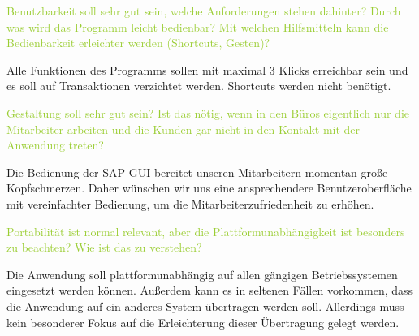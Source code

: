 \textcolor{YellowGreen}{Benutzbarkeit soll sehr gut sein, welche Anforderungen stehen dahinter? Durch was wird das Programm leicht bedienbar? Mit welchen Hilfsmitteln kann die Bedienbarkeit erleichter werden (Shortcuts, Gesten)?}

\textcolor{NavyBlue}{Alle Funktionen des Programms sollen mit maximal 3 Klicks erreichbar sein und es soll auf Transaktionen verzichtet werden. Shortcuts werden nicht benötigt.}


\textcolor{YellowGreen}{Gestaltung soll sehr gut sein? Ist das nötig, wenn in den Büros eigentlich nur die Mitarbeiter arbeiten und die Kunden gar nicht in den Kontakt mit der Anwendung treten?}

\textcolor{NavyBlue}{Die Bedienung der SAP GUI bereitet unseren Mitarbeitern momentan große Kopfschmerzen. Daher wünschen wir uns eine ansprechendere Benutzeroberfläche mit vereinfachter Bedienung, um die Mitarbeiterzufriedenheit zu erhöhen.}


\textcolor{YellowGreen}{Portabilität ist normal relevant, aber die Plattformunabhängigkeit ist besonders zu beachten? Wie ist das zu verstehen?}

\textcolor{NavyBlue}{Die Anwendung soll plattformunabhängig auf allen gängigen Betriebssystemen eingesetzt werden können. Außerdem kann es in seltenen Fällen vorkommen, dass die Anwendung auf ein anderes System übertragen werden soll. Allerdings muss kein besonderer Fokus auf die Erleichterung dieser Übertragung gelegt werden.}